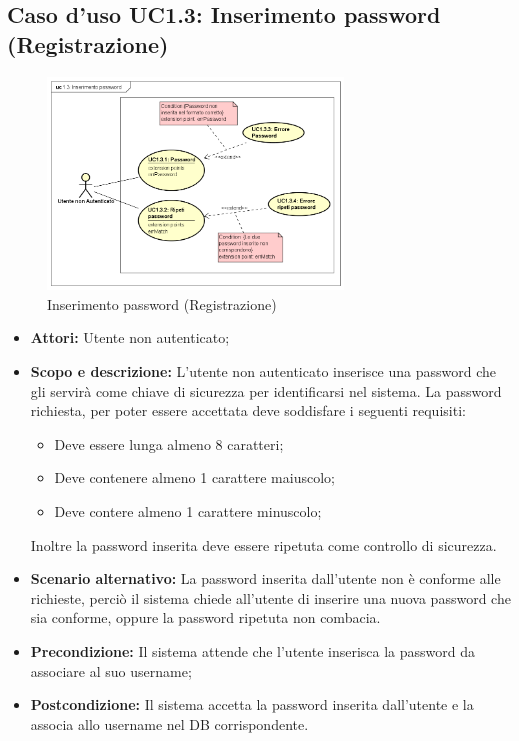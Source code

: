 \documentclass[12pt,a4paper,titlepage]{article}
\begin{document}
	\subsection{Caso d'uso UC1.3: Inserimento password (Registrazione)}
	\label{UC1.3}
	\begin{figure}[H]
		\centering
		\includegraphics[width=0.7\textwidth]{UseCase/InserimentoPassword}
		\caption{Inserimento password (Registrazione)}
	\end{figure}
	\begin{itemize}
		\item \textbf{Attori: }Utente non autenticato;
		\item \textbf{Scopo e descrizione: } L'utente non autenticato inserisce una password che gli servirà come chiave di sicurezza per identificarsi nel sistema. La password richiesta, per poter essere accettata deve soddisfare i seguenti requisiti: 
		\begin{itemize}
			\item Deve essere lunga almeno 8 caratteri; 
			\item Deve contenere almeno 1 carattere maiuscolo; 
			\item Deve contere almeno 1 carattere minuscolo;
		\end{itemize}
		Inoltre la password inserita deve essere ripetuta come controllo di sicurezza.
		\item \textbf{Scenario alternativo: }La password inserita dall'utente non è conforme alle richieste, perciò il sistema chiede all'utente di inserire una nuova password che sia conforme, oppure la password ripetuta non combacia.
		\item \textbf{Precondizione: }Il sistema attende che l'utente inserisca la password da associare al suo username;
		\item \textbf{Postcondizione: }Il sistema accetta la password inserita dall'utente e la associa allo username nel DB corrispondente.
	\end{itemize}
\end{document}

